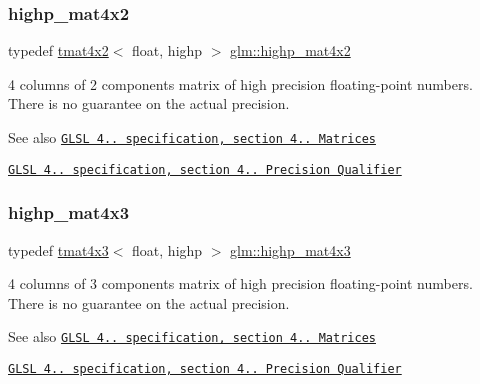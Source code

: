 \subsubsection{\texorpdfstring{highp\+\_\+mat4x2}{highp\_mat4x2}}
{\footnotesize\ttfamily typedef \hyperlink{structglm_1_1tmat4x2}{tmat4x2}$<$ float, highp $>$ \hyperlink{group__core__precision_ga289d5d6b112dc6e3f545e7f98d3d0b5c}{glm\+::highp\+\_\+mat4x2}}

4 columns of 2 components matrix of high precision floating-\/point numbers. There is no guarantee on the actual precision.

\begin{DoxySeeAlso}{See also}
\href{http://www.opengl.org/registry/doc/GLSLangSpec.4.20.8.pdf}{\tt G\+L\+SL 4.. specification, section 4.. Matrices} 

\href{http://www.opengl.org/registry/doc/GLSLangSpec.4.20.8.pdf}{\tt G\+L\+SL 4.. specification, section 4.. Precision Qualifier} 
\end{DoxySeeAlso}
\mbox{\label{group__core__precision_ga549b3b126dfbf5f9fef6b76deb15cb4e}} 
\subsubsection{\texorpdfstring{highp\+\_\+mat4x3}{highp\_mat4x3}}
{\footnotesize\ttfamily typedef \hyperlink{structglm_1_1tmat4x3}{tmat4x3}$<$ float, highp $>$ \hyperlink{group__core__precision_ga549b3b126dfbf5f9fef6b76deb15cb4e}{glm\+::highp\+\_\+mat4x3}}

4 columns of 3 components matrix of high precision floating-\/point numbers. There is no guarantee on the actual precision.

\begin{DoxySeeAlso}{See also}
\href{http://www.opengl.org/registry/doc/GLSLangSpec.4.20.8.pdf}{\tt G\+L\+SL 4.. specification, section 4.. Matrices} 

\href{http://www.opengl.org/registry/doc/GLSLangSpec.4.20.8.pdf}{\tt G\+L\+SL 4.. specification, section 4.. Precision Qualifier} 
\end{DoxySeeAlso}
\mbox{\label{group__core__precision_gaccec2a0346f946bcbd656386a9ab87d7}} 
